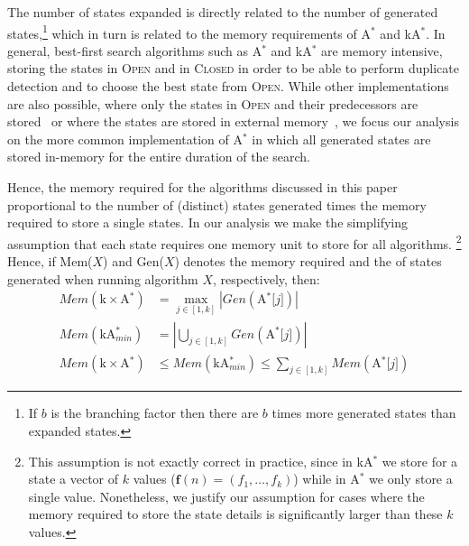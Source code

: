 \documentclass{aicom2e}
\newcommand{\astar}{A$^*$}
\newcommand{\kastar}{kA$^*$}
\newcommand{\kastarmin}{kA$^*_{min}$}
\newcommand{\kxastar}{k$\times$A$^*$}
\newcommand{\astari}[1]{A$^*$[$#1$]}
\newcommand{\open}{\textsc{Open}}
\newcommand{\closed}{\textsc{Closed}}
\begin{document}
The number of states expanded is directly related to the number of generated
states,\footnote{If $b$ is the branching factor then there are $b$ times more
	generated states than expanded states.} which in turn is related to the memory
requirements of \astar{} and \kastar{}. In general, best-first search
algorithms such as \astar{} and \kastar{} are memory intensive, storing the
states in \open{} and in \closed{} in order to be able to perform duplicate
detection and to choose the best state from \open{}. While other
implementations are also possible, where only the states in \open{} and their
predecessors are stored~\cite{zhou2006breadth,korf2004best} or where the states
are stored in external
memory~\cite{zhou2004structured,edelkamp2016external,edelkamp2005external}, we
focus our analysis on the more common implementation of \astar{} in which all
generated states are stored in-memory for the entire duration of the search.

Hence, the memory required for the algorithms discussed in this paper
proportional to the number of (distinct) states generated times the memory
required to store a single states.
In our analysis we make the simplifying assumption that each state requires one
memory unit to store for all algorithms. \footnote{This assumption is not
exactly correct in practice, since in \kastar{} we store for a state a vector
of $k$ values ($\textbf{f}(n)=(f_1,\ldots,f_k)$)  while in \astar{} we only
store a single value. Nonetheless, we justify our assumption for cases where
the memory required to store the state details is significantly larger than
these $k$ values.} Hence, if Mem($X$) and Gen($X$) denotes the memory required
and the of states generated when running algorithm $X$, respectively, then:
\begin{align}
Mem(\text{\kxastar{}})&=\max_{j\in [1,k]}| Gen(\text{\astari{j}})| \label{eq:kxastar-mem}\\
Mem(\text{\kastarmin{}})&=|\bigcup_{j\in [1,k]} Gen(\text{\astari{j}})| \label{eq:kastar-mem}\\
Mem(\text{\kxastar{}})&\leq Mem(\text{\kastarmin{}}) \leq \sum_{j\in[1,k]} Mem(\text{\astari{j}}) \label{eq:kxastar-kastar-mem}
\end{align}
\end{document}
